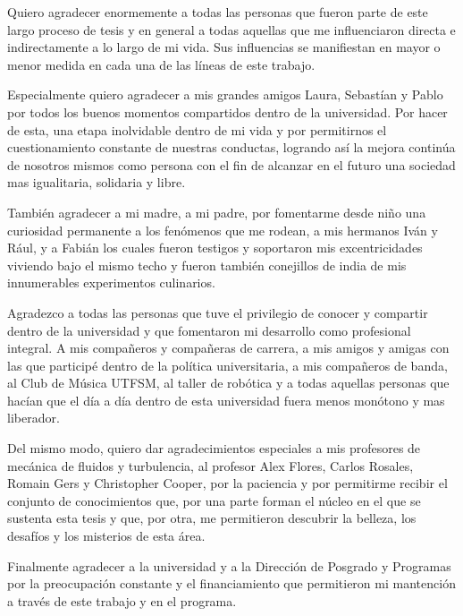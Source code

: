 \vspace{-1.5cm}

Quiero agradecer enormemente a todas las personas que fueron parte de este largo proceso de tesis y en general a todas aquellas que me influenciaron directa e indirectamente a lo largo de mi vida. Sus influencias se manifiestan en mayor o menor medida en cada una de las líneas de este trabajo. 

Especialmente quiero agradecer a mis grandes amigos Laura, Sebastían y Pablo por todos los buenos momentos compartidos dentro de la universidad. Por hacer de esta, una etapa inolvidable dentro de mi vida y por permitirnos el cuestionamiento constante de nuestras conductas, logrando así la mejora continúa de nosotros mismos como persona con el fin de alcanzar en el futuro una sociedad mas igualitaria, solidaria y libre. 

También agradecer a mi madre, a mi padre, por fomentarme desde niño una curiosidad permanente a los fenómenos que me rodean, a mis hermanos Iván y Rául, y a Fabián los cuales fueron testigos y soportaron mis excentricidades viviendo bajo el mismo techo y fueron también conejillos de india de mis innumerables experimentos culinarios.

Agradezco a todas las personas que tuve el privilegio de conocer y compartir dentro de la universidad y que fomentaron mi desarrollo como profesional integral. A mis compañeros y compañeras de carrera, a mis amigos y amigas con las que participé dentro de la política universitaria, a mis compañeros de banda, al Club de Música UTFSM, al taller de robótica y a todas aquellas personas que hacían que el día a día dentro de esta universidad fuera menos monótono y mas liberador. 

Del mismo modo, quiero dar agradecimientos especiales a mis profesores de mecánica de fluidos y turbulencia, al profesor Alex Flores, Carlos Rosales, Romain Gers y Christopher Cooper, por la paciencia y por permitirme recibir el conjunto de conocimientos que, por una parte forman el núcleo en el que se sustenta esta tesis y que, por otra, me permitieron descubrir la belleza, los desafíos y los misterios de esta área.

Finalmente agradecer a la universidad y a la Dirección de Posgrado y Programas por la preocupación constante y el financiamiento que permitieron mi mantención a través de este trabajo y en el programa.
